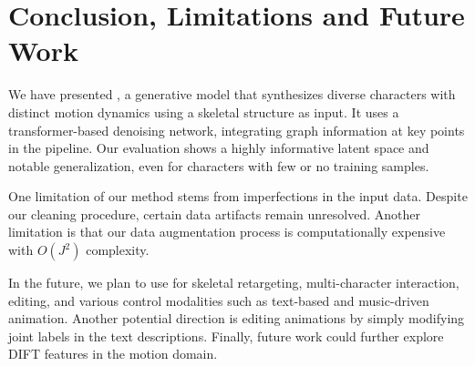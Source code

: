 \section{Conclusion, Limitations and Future Work}\label{sec:conclusion}

We have presented \algoname, a generative model that synthesizes diverse characters with distinct motion dynamics using a skeletal structure as input.
It uses a 
transformer-based denoising network, integrating graph information
at key points in the pipeline.
Our evaluation shows a highly informative latent space and notable generalization, even for characters with few or no training samples. 

One limitation of our method stems from imperfections in the input data. Despite our cleaning procedure, certain data artifacts remain unresolved. 
Another limitation is that our data augmentation process is computationally expensive with $O(J^2)$ complexity.


In the future, we plan to use \algoname for skeletal retargeting, multi-character interaction, editing, and various control modalities such as text-based and music-driven animation.
Another potential direction is editing
animations by simply modifying joint labels in the text descriptions.
Finally, future work could further explore DIFT features
in the motion domain.

